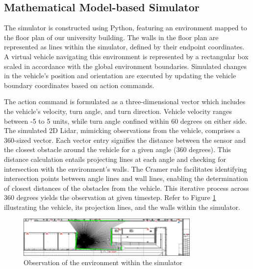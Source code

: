 \documentclass[12pt,twoside,a4paper,parskip]{scrbook} %
\begin{document}
\subsection{Mathematical Model-based Simulator}

The simulator is constructed using Python, featuring an environment mapped to the floor plan of our university building. The walls in the floor plan are represented as lines within the simulator, defined by their endpoint coordinates. A virtual vehicle navigating this environment is represented by a rectangular box scaled in accordance with the global environment boundaries. Simulated changes in the vehicle's position and orientation are executed by updating the vehicle boundary coordinates based on action commands.

The action command is formulated as a three-dimensional vector which includes the vehicle's velocity, turn angle, and turn direction. Vehicle velocity ranges between -5 to 5 units, while turn angle confined within 60 degrees on either side. The simulated 2D Lidar, mimicking observations from the vehicle, comprises a 360-sized vector. Each vector entry signifies the distance between the sensor and the closest obstacle around the vehicle for a given angle (360 degrees). This distance calculation entails projecting lines at each angle and checking for intersection with the environment's walls. The Cramer rule facilitates identifying intersection points between angle lines and wall lines, enabling the determination of closest distances of the obstacles from the vehicle. This iterative process across 360 degrees yields the observation at given timestep. Refer to Figure \ref{fig:simu} illustrating the vehicle, its projection lines, and the walls within the simulator. 
\begin{figure}[h]
    \centering
    \includegraphics[width=0.80\textwidth]{Images/simu.png}
    \caption{Observation of the environment within the simulator}
    \label{fig:simu}
  \end{figure}
\end{document}
